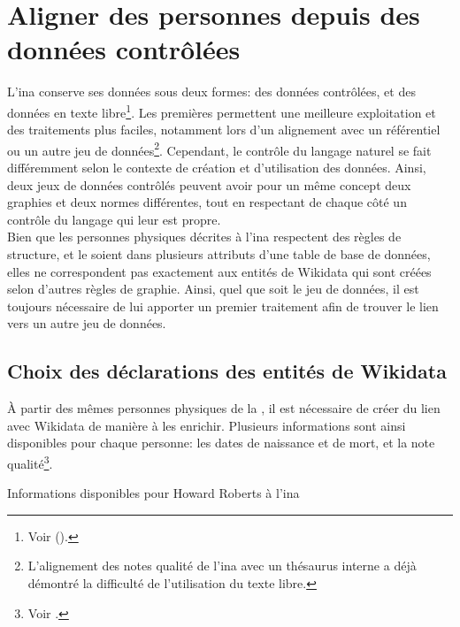 \section{\label{II-C-2}Aligner des personnes depuis des données contrôlées}

L'\ac{ina} conserve ses données sous deux formes: des données contrôlées, et des données en texte libre\footnote{Voir  ().}. Les premières permettent une meilleure exploitation et des traitements plus faciles, notamment lors d'un alignement avec un référentiel ou un autre jeu de données\footnote{L'alignement des notes qualité de l'\ac{ina} avec un thésaurus interne a déjà démontré la difficulté de l'utilisation du texte libre.}. Cependant, le contrôle du langage naturel se fait différemment selon le contexte de création et d'utilisation des données. Ainsi, deux jeux de données contrôlés peuvent avoir pour un même concept deux graphies et deux normes différentes, tout en respectant de chaque côté un contrôle du langage qui leur est propre.\\

Bien que les personnes physiques décrites à l'\ac{ina} respectent des règles de structure, et le soient dans plusieurs attributs d'une table de base de données, elles ne correspondent pas exactement aux entités de Wikidata qui sont créées selon d'autres règles de graphie. Ainsi, quel que soit le jeu de données, il est toujours nécessaire de lui apporter un premier traitement afin de trouver le lien vers un autre jeu de données.

\subsection{\label{II-C-2-a}Choix des déclarations des entités de Wikidata}

À partir des mêmes personnes physiques de la , il est nécessaire de créer du lien avec Wikidata de manière à les enrichir. Plusieurs informations sont ainsi disponibles pour chaque personne: les dates de naissance et de mort, et la note qualité\footnote{Voir .}.
\begin{table}[h!]
	\centering
	\caption{Informations disponibles pour Howard Roberts à l'\ac{ina}}
	\label{table_roberts_1}
\end{table}
\medskip

